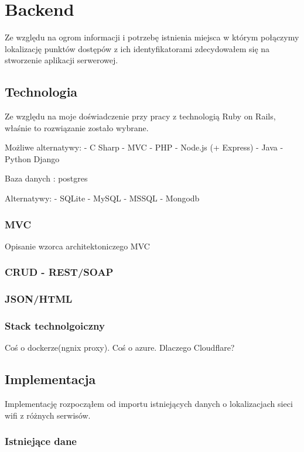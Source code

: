 \chapter{Backend}

Ze względu na ogrom informacji i potrzebę istnienia miejsca w którym połączymy lokalizację punktów dostępów z ich identyfikatorami zdecydowałem się na stworzenie aplikacji serwerowej. 

\section{Technologia}

Ze względu na moje doświadczenie przy pracy z technologią Ruby on Rails, właśnie to rozwiązanie zostało wybrane.

Możliwe alternatywy:
 - C Sharp - MVC
 - PHP
 - Node.js (+ Express)
 - Java
 - Python Django

Baza danych : postgres

Alternatywy:
 - SQLite
 - MySQL
 - MSSQL
 - Mongodb
 
 
\subsection{MVC}
Opisanie wzorca architektoniczego MVC

\subsection{CRUD - REST/SOAP}

\subsection{JSON/HTML}

\subsection{Stack technolgoiczny}
Coś o dockerze(ngnix proxy). Coś o azure. Dlaczego Cloudflare?


\section{Implementacja}

Implementację rozpocząłem od importu istniejących danych o lokalizacjach sieci wifi z różnych serwisów.

\subsection{Istniejące dane}

